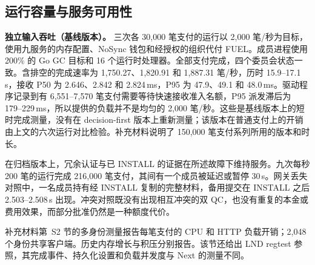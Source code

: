 \subsection{运行容量与服务可用性}
\label{sec:eval-operating}

\noindent\textbf{独立输入吞吐（基线版本）。}
三次各 30,000 笔支付的运行以 2,000 笔/秒为目标，使用九服务的内存配置、NoSync 钱包和经授权的组织代付 FUEL。成员进程使用 200\% 的 Go GC 目标和 16 个运行时处理器。全部支付完成，四个委员会状态一致。含排空的完成速率为 1,750.27、1,820.91 和 1,887.31 笔/秒，历时 15.9--17.1\,s，接收 P50 为 2.646、2.842 和 2.824\,ms，P95 为 47.9、49.1 和 48.0\,ms。驱动程序记录到有 6,551--7,570 笔支付需要等待快速接收准入名额，P95 派发滞后为 179--229\,ms，所以提供的负载并不是均匀的 2,000 笔/秒。这些是基线版本上的短时完成测量，没有在 decision-first 版本上重新测量；该版本在普通支付上的开销由上文的六次运行对比检验。补充材料说明了 150,000 笔支付系列所用的版本和时长。

在归档版本上，冗余认证与已 INSTALL 的证据在所述故障下维持服务。九次每秒 200 笔的运行完成 216,000 笔支付，其间有一个成员被延迟或暂停 30\,s。网关丢失对照中，一名成员持有经 INSTALL 复制的完整材料，备用提交在 INSTALL 之后 2.503--2.508\,s 出现。冲突对照既没有出现相互冲突的双 QC，也没有重复的本金或费用效果，而部分批准仍然是一种额度代价。

补充材料第~S2 节的多身份测量报告每笔支付的 CPU 和 HTTP 负载开销；2,048 个身份共享客户端。历史内存增长与积压分别报告。该节还给出 LND regtest 参照，其完成事件、持久化设置和负载并发度与 Next 的测量不同。
